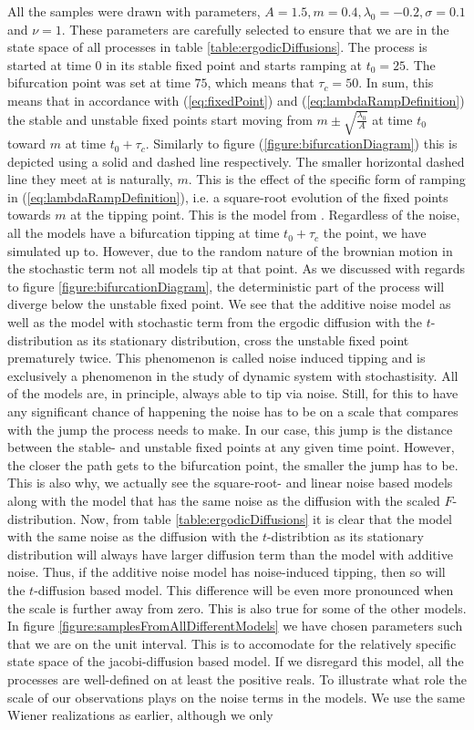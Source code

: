 All the samples were drawn with parameters, $A = 1.5, m = 0.4, \lambda_0 = -0.2, \sigma = 0.1$ and $\nu = 1$. These parameters are carefully selected to ensure that we are in the state space of all processes in table \ref{table:ergodicDiffusions}. The process is started at time $0$ in its stable fixed point and starts ramping at $t_0 = 25$. The bifurcation point was set at time $75$, which means that $\tau_c = 50$. In sum, this means that in accordance with (\ref{eq:fixedPoint}) and (\ref{eq:lambdaRampDefinition}) the stable and unstable fixed points start moving from $m\pm\sqrt{\frac{\lambda_0}{A}}$ at time $t_0$ toward $m$ at time $t_0 + \tau_c$. Similarly to figure (\ref{figure:bifurcationDiagram}) this is depicted using a solid and dashed line respectively. The smaller horizontal dashed line they meet at is naturally, $m$. This is the effect of the specific form of ramping in (\ref{eq:lambdaRampDefinition}), i.e. a square-root evolution of the fixed points towards $m$ at the tipping point. This is the model from \cite{Ditlevsen2023}. Regardless of the noise, all the models have a bifurcation tipping at time $t_0+\tau_c$ the point, we have simulated up to. However, due to the random nature of the brownian motion in the stochastic term not all models tip at that point. As we discussed with regards to figure \ref{figure:bifurcationDiagram}, the deterministic part of the process will diverge below the unstable fixed point. We see that the additive noise model as well as the model with stochastic term from the ergodic diffusion with the $t$-distribution as its stationary distribution, cross the unstable fixed point prematurely twice. This phenomenon is called noise induced tipping and is exclusively a phenomenon in the study of dynamic system with stochastisity. All of the models are, in principle, always able to tip via noise. Still, for this to have any significant chance of happening the noise has to be on a scale that compares with the jump the process needs to make. In our case, this jump is the distance between the stable- and unstable fixed points at any given time point. However, the closer the path gets to the bifurcation point, the smaller the jump has to be. This is also why, we actually see the square-root- and linear noise based models along with the model that has the same noise as the diffusion with the scaled $F$-distribution. Now, from table \ref{table:ergodicDiffusions} it is clear that the model with the same noise as the diffusion with the $t$-distribtion as its stationary distribution will always have larger diffusion term than the model with additive noise. Thus, if the additive noise model has noise-induced tipping, then so will the $t$-diffusion based model. This difference will be even more pronounced when the scale is further away from zero. This is also true for some of the other models. In figure \ref{figure:samplesFromAllDifferentModels} we have chosen parameters such that we are on the unit interval. This is to accomodate for the relatively specific state space of the jacobi-diffusion based model. If we disregard this model, all the processes are well-defined on at least the positive reals. To illustrate what role the scale of our observations plays on the noise terms in the models. We use the same Wiener realizations as earlier, although we only 